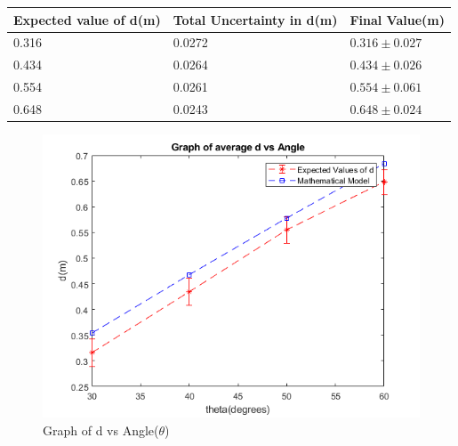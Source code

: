\begin{center}
\begin{tabular}{|l|l|l|}
\hline
Expected value of   d(m) & Total Uncertainty in d(m) & Final Value(m)                     \\ \hline
0.316                    & 0.0272                     & $0.316 \pm 0.027$ \\ \hline
0.434                    & 0.0264                     & $ 0.434\pm 0.026$   \\ \hline
0.554                    & 0.0261                     & $ 0.554\pm 0.061$   \\ \hline
0.648                    & 0.0243                     & $ 0.648\pm 0.024$   \\ \hline
\end{tabular}
\end{center}
\newpage
\begin{figure}[h!]
    \centering
    \includegraphics[width=\textwidth]{figures/Mathematical_Model.png}
    \caption{Graph of d vs Angle($\theta$)}
    \label{fig:yx}
\end{figure}


